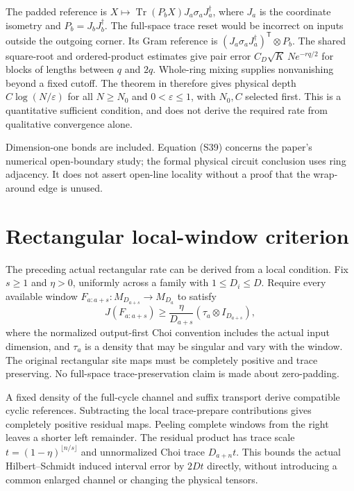 \documentclass{article}
\begin{document}
The padded reference is
$X\mapsto\operatorname{Tr}(P_bX)J_a\sigma_aJ_a^\dagger$,
where $J_a$ is the coordinate isometry and $P_b=J_bJ_b^\dagger$.
The full-space trace reset would be incorrect on inputs outside the
outgoing corner. Its Gram reference is
$(J_a\sigma_aJ_a^\dagger)^{\mathsf T}\otimes P_b$.
The shared square-root and ordered-product estimates give pair error
$C_D\sqrt K\,N e^{-rq/2}$ for blocks of lengths between $q$ and $2q$.
Whole-ring mixing supplies nonvanishing beyond a fixed cutoff.
The theorem
in 
therefore gives physical depth $C\log(N/\varepsilon)$ for all
$N\ge N_0$ and $0<\varepsilon\le1$, with $N_0,C$ selected first.
This is a quantitative sufficient condition, and does not derive the
required rate from qualitative convergence alone.

Dimension-one bonds are included. Equation (S39) concerns the paper's
numerical open-boundary study; the formal physical circuit conclusion
uses ring adjacency. It does not assert open-line locality without a
proof that the wrap-around edge is unused.

\section{Rectangular local-window criterion}
The preceding actual rectangular rate can be derived from a local condition.
Fix $s\ge1$ and $\eta>0$, uniformly across a family with $1\le D_i\le D$.
Require every available window $F_{a:a+s}:M_{D_{a+s}}\to M_{D_a}$ to satisfy
\[
    J(F_{a:a+s})\ge\frac{\eta}{D_{a+s}}(\tau_a\otimes I_{D_{a+s}}),
\]
where the normalized output-first Choi convention includes the actual input
dimension, and $\tau_a$ is a density that may be singular and vary with the window.
The original rectangular site maps must be completely positive and trace preserving.
No full-space trace-preservation claim is made about zero-padding.

A fixed density of the full-cycle channel and suffix transport derive compatible
cyclic references. Subtracting the local trace-prepare contributions gives completely
positive residual maps. Peeling complete windows from the right leaves a shorter
left remainder. The residual product has trace scale
$t=(1-\eta)^{\lfloor n/s\rfloor}$ and unnormalized Choi trace $D_{a+n}t$.
This bounds the actual Hilbert--Schmidt induced interval error by $2Dt$ directly,
without introducing a common enlarged channel or changing the physical tensors.
\end{document}
